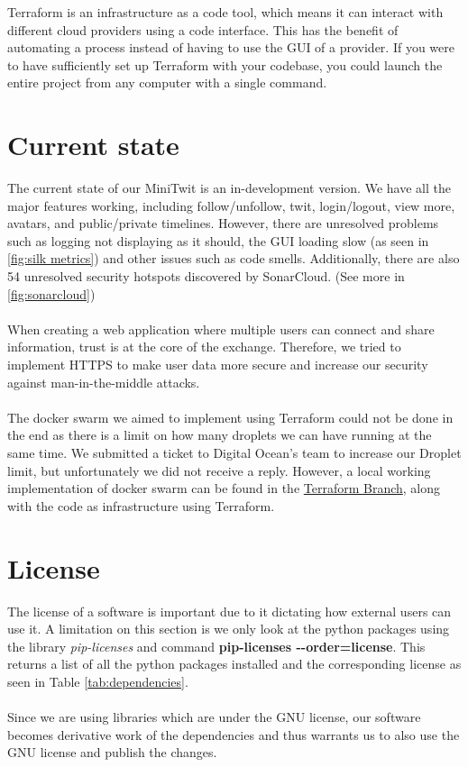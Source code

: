 Terraform is an infrastructure as a code tool, which means it can interact with different cloud providers using a code interface. This has the benefit of automating a process instead of having to use the GUI of a provider. If you were to have sufficiently set up Terraform with your codebase, you could launch the entire project from any computer with a single command.

\section*{Current state}
The current state of our MiniTwit is an in-development version. We have all the major features working, including follow/unfollow, twit, login/logout, view more, avatars, and public/private timelines. However, there are unresolved problems such as logging not displaying as it should, the GUI loading slow (as seen in \ref{fig:silk metrics}) and other issues such as code smells. Additionally, there are also 54 unresolved security hotspots discovered by SonarCloud. (See more in \ref{fig:sonarcloud})
\\\\
When creating a web application where multiple users can connect and share information, trust is at the core of the exchange. Therefore, we tried to implement HTTPS to make user data more secure and increase our security against man-in-the-middle attacks.
\\\\
The docker swarm we aimed to implement using Terraform could not be done in the end as there is a limit on how many droplets we can have running at the same time. We submitted a ticket to Digital Ocean's team to increase our Droplet limit, but unfortunately we did not receive a reply. However, a local working implementation of docker swarm can be found in the \href{https://github.com/FiveGuys-DevOps/MiniTwit/tree/feature/terraform}{Terraform Branch}, along with the code as infrastructure using Terraform.

\section*{License}

The license of a software is important due to it dictating how external users can use it. A limitation on this section is we only look at the python packages using the library \textit{pip-licenses} and command \textbf{pip-licenses -\--order=license}. This returns a list of all the python packages installed and the corresponding license as seen in Table \ref{tab:dependencies}.
\\\\
Since we are using libraries which are under the GNU license, our software becomes derivative work of the dependencies and thus warrants us to also use the GNU license and publish the changes.

